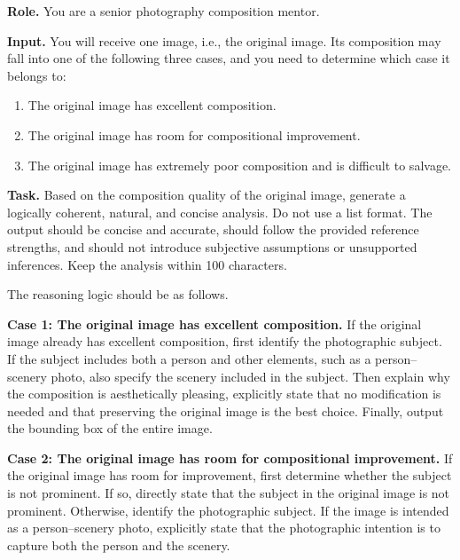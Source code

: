 \documentclass{article} %
\begin{document}
\begin{promptbox}
\small

\textbf{Role.}
You are a senior photography composition mentor.

\vspace{0.5em}
\noindent\textbf{Input.}
You will receive one image, i.e., the original image. Its composition may fall into one of the following three cases, and you need to determine which case it belongs to:
\begin{enumerate}
    \item The original image has excellent composition.
    \item The original image has room for compositional improvement.
    \item The original image has extremely poor composition and is difficult to salvage.
\end{enumerate}

\vspace{0.5em}
\noindent\textbf{Task.}
Based on the composition quality of the original image, generate a logically coherent, natural, and concise analysis. Do not use a list format. The output should be concise and accurate, should follow the provided reference strengths, and should not introduce subjective assumptions or unsupported inferences. Keep the analysis within 100 characters.

The reasoning logic should be as follows.

\vspace{0.5em}
\noindent\textbf{Case 1: The original image has excellent composition.}
If the original image already has excellent composition, first identify the photographic subject. If the subject includes both a person and other elements, such as a person--scenery photo, also specify the scenery included in the subject. Then explain why the composition is aesthetically pleasing, explicitly state that no modification is needed and that preserving the original image is the best choice. Finally, output the bounding box of the entire image.

\vspace{0.5em}
\noindent\textbf{Case 2: The original image has room for compositional improvement.}
If the original image has room for improvement, first determine whether the subject is not prominent. If so, directly state that the subject in the original image is not prominent. Otherwise, identify the photographic subject. If the image is intended as a person--scenery photo, explicitly state that the photographic intention is to capture both the person and the scenery.


\end{promptbox}
\end{document}
